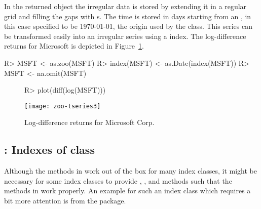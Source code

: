 \documentclass{Z}
\begin{document}
In the returned  object the irregular data is stored by extending
it in a regular grid and filling the gaps with s. The time is stored
in days starting from an , in this case specified to be 1970-01-01, the
origin used by the  class.
This series can be transformed easily into an irregular  series 
using a  index. The log-difference returns for Microsoft
is depicted in Figure~\ref{fig:tseries}.

\begin{Schunk}
\begin{Sinput}
R> MSFT <- as.zoo(MSFT)
R> index(MSFT) <- as.Date(index(MSFT))
R> MSFT <- na.omit(MSFT)
\end{Sinput}
\end{Schunk}

\begin{figure}[h!]
\begin{center}
\begin{Schunk}
\begin{Sinput}
R> plot(diff(log(MSFT)))
\end{Sinput}
\end{Schunk}
\texttt{[image: zoo-tseries3]}
\caption{\label{fig:tseries} Log-difference returns for Microsoft Corp.}
\end{center}
\end{figure}


\subsection[fCalendar: Indexes of class "timeDate"]{: Indexes of class }
\label{sec:fCalendar}

Although the methods in  work out of the box for many index classes,
it might be necessary for some index classes to provide , ,
 and  methods such that the methods in  
work properly. An example for such an index class which requires a bit more
attention is  from the  package.
\end{document}
